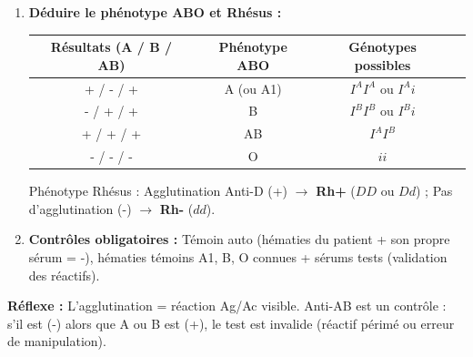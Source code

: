\documentclass[11pt]{article}
\begin{document}
\begin{methode}
\begin{enumerate}
\begin{center}
\begin{tabular}{|c|c|c|}
            \end{tabular}
        \end{center}
        \item \textbf{Déduire le phénotype ABO et Rhésus :}
        \begin{center}
            \begin{tabular}{|c|c|c|c|}
                \hline
                \textbf{Résultats (A / B / AB)} & \textbf{Phénotype ABO} & \textbf{Génotypes possibles} \\ \hline
                + / - / + & A (ou A1) & $I^A I^A$ ou $I^A i$ \\ \hline
                - / + / + & B & $I^B I^B$ ou $I^B i$ \\ \hline
                + / + / + & AB & $I^A I^B$ \\ \hline
                - / - / - & O & $ii$ \\ \hline
            \end{tabular}
        \end{center}
        Phénotype Rhésus : Agglutination Anti-D (+) $\rightarrow$ \textbf{Rh+} ($DD$ ou $Dd$) ; Pas d'agglutination (-) $\rightarrow$ \textbf{Rh-} ($dd$).
        \item \textbf{Contrôles obligatoires :} Témoin auto (hématies du patient + son propre sérum = -), hématies témoins A1, B, O connues + sérums tests (validation des réactifs).
    \end{enumerate}
    \textbf{Réflexe :} L'agglutination = réaction Ag/Ac visible. Anti-AB est un contrôle : s'il est (-) alors que A ou B est (+), le test est invalide (réactif périmé ou erreur de manipulation).
\end{methode}
\end{document}
